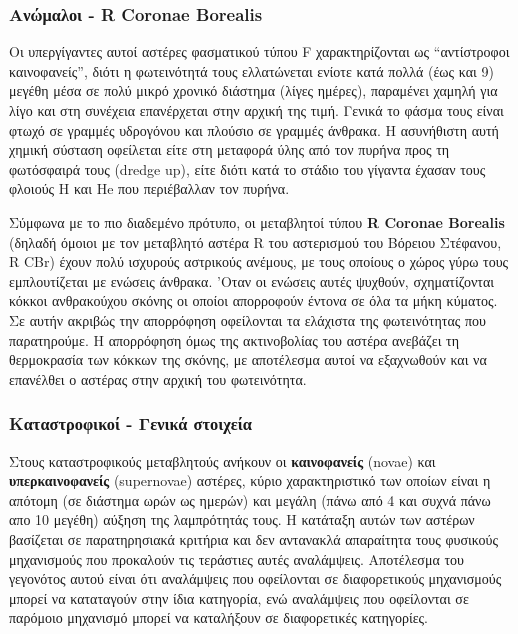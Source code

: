 \subsubsection{Ανώμαλοι - R Coronae Borealis}
Οι υπεργίγαντες αυτοί αστέρες φασματικού τύπου F χαρακτηρίζονται ως ``αντίστροφοι καινοφανείς'', διότι η φωτεινότητά τους ελλατώνεται ενίοτε κατά πολλά (έως και 9) μεγέθη μέσα σε πολύ μικρό χρονικό διάστημα (λίγες ημέρες), παραμένει χαμηλή για λίγο και στη συνέχεια επανέρχεται στην αρχική της τιμή. Γενικά το φάσμα τους είναι φτωχό σε γραμμές υδρογόνου και πλούσιο σε γραμμές άνθρακα. Η ασυνήθιστη αυτή χημική σύσταση οφείλεται είτε στη μεταφορά ύλης από τον πυρήνα προς τη φωτόσφαιρά τους (dredge up), είτε διότι κατά το στάδιο του γίγαντα έχασαν τους φλοιούς H και He που περιέβαλλαν τον πυρήνα.

Σύμφωνα με το πιο διαδεμένο πρότυπο, οι μεταβλητοί τύπου \textbf{R Coronae Borealis} (δηλαδή όμοιοι με τον μεταβλητό αστέρα R του αστερισμού του Βόρειου Στέφανου, R CBr) έχουν πολύ ισχυρούς αστρικούς ανέμους, με τους οποίους ο χώρος γύρω τους εμπλουτίζεται με ενώσεις άνθρακα. 'Οταν οι ενώσεις αυτές ψυχθούν, σχηματίζονται κόκκοι ανθρακούχου σκόνης οι οποίοι απορροφούν έντονα σε όλα τα μήκη κύματος. Σε αυτήν ακριβώς την απορρόφηση οφείλονται τα ελάχιστα της φωτεινότητας που παρατηρούμε. Η απορρόφηση όμως της ακτινοβολίας του αστέρα ανεβάζει τη θερμοκρασία των κόκκων της σκόνης, με αποτέλεσμα αυτοί να εξαχνωθούν και να επανέλθει ο αστέρας στην αρχική του φωτεινότητα.

\subsubsection{Καταστροφικοί - Γενικά στοιχεία}
Στους καταστροφικούς μεταβλητούς ανήκουν οι \textbf{καινοφανείς} (novae) και \textbf{υπερκαινοφανείς} (supernovae) αστέρες, κύριο χαρακτηριστικό των οποίων είναι η απότομη (σε διάστημα ωρών ως ημερών) και μεγάλη (πάνω από 4 και συχνά πάνω απο 10 μεγέθη) αύξηση της λαμπρότητάς τους. Η κατάταξη αυτών των αστέρων βασίζεται σε παρατηρησιακά κριτήρια και δεν αντανακλά απαραίτητα τους φυσικούς μηχανισμούς που προκαλούν τις τεράστιες αυτές αναλάμψεις. Αποτέλεσμα του γεγονότος αυτού είναι ότι αναλάμψεις που οφείλονται σε διαφορετικούς μηχανισμούς μπορεί να καταταγούν στην ίδια κατηγορία, ενώ αναλάμψεις που οφείλονται σε παρόμοιο μηχανισμό μπορεί να καταλήξουν σε διαφορετικές κατηγορίες.

